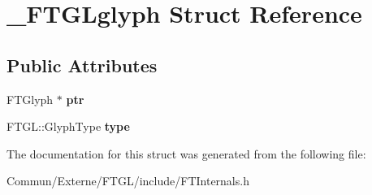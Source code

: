 \hypertarget{struct___f_t_g_lglyph}{}\section{\+\_\+\+F\+T\+G\+Lglyph Struct Reference}
\label{struct___f_t_g_lglyph}
\subsection*{Public Attributes}
\begin{DoxyCompactItemize}
\item 
F\+T\+Glyph $\ast$ {\bfseries ptr}\hypertarget{struct___f_t_g_lglyph_a6bd6880c871ebdc4f78f15f698e8421b}{}\label{struct___f_t_g_lglyph_a6bd6880c871ebdc4f78f15f698e8421b}

\item 
F\+T\+G\+L\+::\+Glyph\+Type {\bfseries type}\hypertarget{struct___f_t_g_lglyph_aa5d5991a60bfba8ee2a8f850553675b8}{}\label{struct___f_t_g_lglyph_aa5d5991a60bfba8ee2a8f850553675b8}

\end{DoxyCompactItemize}


The documentation for this struct was generated from the following file\+:\begin{DoxyCompactItemize}
\item 
Commun/\+Externe/\+F\+T\+G\+L/include/F\+T\+Internals.\+h\end{DoxyCompactItemize}
